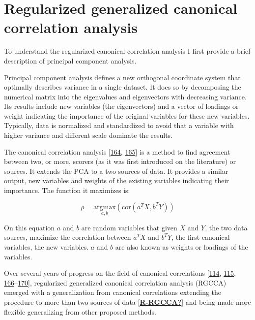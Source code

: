 \documentclass[
  a4paper,
]{book}
\begin{document}
\hypertarget{regularized-generalized-canonical-correlation-analysis}{%
\section{Regularized generalized canonical correlation analysis}\label{regularized-generalized-canonical-correlation-analysis}}

To understand the regularized canonical correlation analysis I first provide a brief description of principal component analysis.

Principal component analysis defines a new orthogonal coordinate system that optimally describes variance in a single dataset.
It does so by decomposing the numerical matrix into the eigenvalues and eigenvectors with decreasing variance.
Its results include new variables (the eigenvectors) and a vector of loadings or weight indicating the importance of the original variables for these new variables.
Typically, data is normalized and standardized to avoid that a variable with higher variance and different scale dominate the results.

The canonical correlation analysis {[}\protect\hyperlink{ref-jordan1875}{164}, \protect\hyperlink{ref-hotelling1936}{165}{]} is a method to find agreement between two, or more, scorers (as it was first introduced on the literature) or sources.
It extends the PCA to a two sources of data.
It provides a similar output, new variables and weights of the existing variables indicating their importance.
The function it maximizes is:

\[
\rho = \underset{a, b}{\text{argmax}} (\text{cor}(a^T X, b^T Y))
\]

On this equation \(a\) and \(b\) are random variables that given \(X\) and \(Y\), the two data sources, maximize the correlation between \(a^T X\) and \(b^T Y\), the first canonical variables, the new variables.
\(a\) and \(b\) are also known as weights or loadings of the variables.

Over several years of progress on the field of canonical correlations {[}\protect\hyperlink{ref-tenenhaus_regularized_2011}{114}, \protect\hyperlink{ref-tenenhaus_variable_2014}{115}, \protect\hyperlink{ref-tenenhaus_component-based_2008}{166}--\protect\hyperlink{ref-gloaguen2020}{170}{]}, regularized generalized canonical correlation analysis (RGCCA) emerged with a generalization from canonical correlations extending the procedure to more than two sources of data {[}\protect\hyperlink{ref-R-RGCCA}{\textbf{R-RGCCA?}}{]} and being made more flexible generalizing from other proposed methods.
\end{document}

